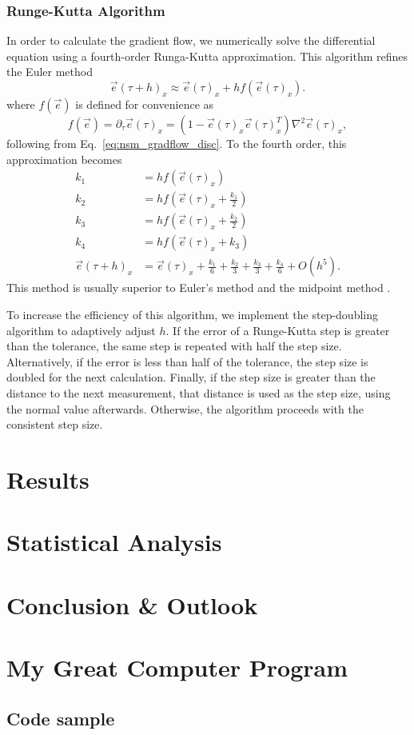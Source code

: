 \documentclass[12pt]{report}
\newcommand{\e}{\vec e}
\begin{document}
\subsection{Runge-Kutta Algorithm}
In order to calculate the gradient flow, we numerically solve the differential equation using a fourth-order Runga-Kutta approximation. This algorithm refines the Euler method 
\begin{equation*}
    \e(\tau+h)_x \approx \e(\tau)_x + h f(\e(\tau)_x).
\end{equation*}
where $f(\e)$ is defined for convenience as 
\begin{equation}
    f(\e)=\partial_\tau \e (\tau)_x  = \left( 1 - \e(\tau)_x \e(\tau)_x^T\right) \nabla^2 \e(\tau)_x,
\end{equation}
following from Eq.~\ref{eq:nsm_gradflow_disc}. To the fourth order, this approximation becomes 
%
\begin{align}
    \label{eq:rungekutta}
    k_1 &= h f(\e(\tau)_x) \\ 
    k_2 &= h f(\e(\tau)_x + \frac{k_1}{2}) \\ 
    k_3 &= h f(\e(\tau)_x + \frac{k_2}{2}) \\ 
    k_4 &= h f(\e(\tau)_x + k_3) \\ 
    \e(\tau+h)_x &= \e(\tau)_x + \frac{k_1}{6} + \frac{k_2}{3} + \frac{k_3}{3} + \frac{k_4}{6} + O(h^5).
\end{align}
This method is usually superior to Euler's method and the midpoint method \cite{vetterling1992}.

To increase the efficiency of this algorithm, we implement the step-doubling algorithm to adaptively adjust $h$. If the error of a Runge-Kutta step is greater than the tolerance, the same step is repeated with half the step size. Alternatively, if the error is less than half of the tolerance, the step size is doubled for the next calculation. Finally, if the step size is greater than the distance to the next measurement, that distance is used as the step size, using the normal value afterwards. Otherwise, the algorithm proceeds with the consistent step size. 




\chapter{Results}
\chapter{Statistical Analysis}

\chapter{Conclusion \& Outlook}



\appendix
\chapter{My Great Computer Program}

\section{Code sample}


\end{document}
